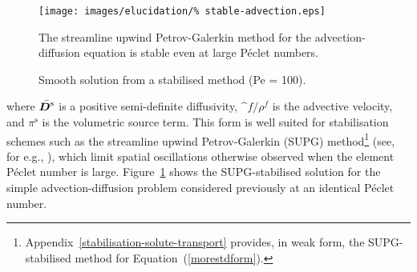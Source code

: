 \begin{figure}
  \begin{center}
    \texttt{[image: images/elucidation/\%
      stable-advection.eps]}
    \caption{Smooth solution from a stabilised method (Pe = 100).}
    \label{stable-solution}
  \end{center}
      {The streamline upwind Petrov-Galerkin method for the
        advection-diffusion equation is stable even at large P\'eclet
        numbers.}
\end{figure}

\noindent where $\bar{\mbox{\boldmath$ D$}^\mathrm{s}}$ is a positive semi-definite
diffusivity, $\bm^{f}/\rho^{f}$ is the advective velocity, and
$\pi^\mathrm{s}$ is the volumetric source term. This form is well
suited for stabilisation schemes such as the streamline upwind
Petrov-Galerkin (SUPG)
method\footnote{Appendix~\ref{stabilisation-solute-transport}
  provides, in weak form, the SUPG-stabilised method for
  Equation~(\ref{morestdform}).} (see, for e.g., \cite{Paper6}), which
limit spatial oscillations otherwise observed when the element
P\'eclet number is large. Figure~\ref{stable-solution} shows the
SUPG-stabilised solution for the simple advection-diffusion problem
considered previously at an identical P\'eclet number.

%

